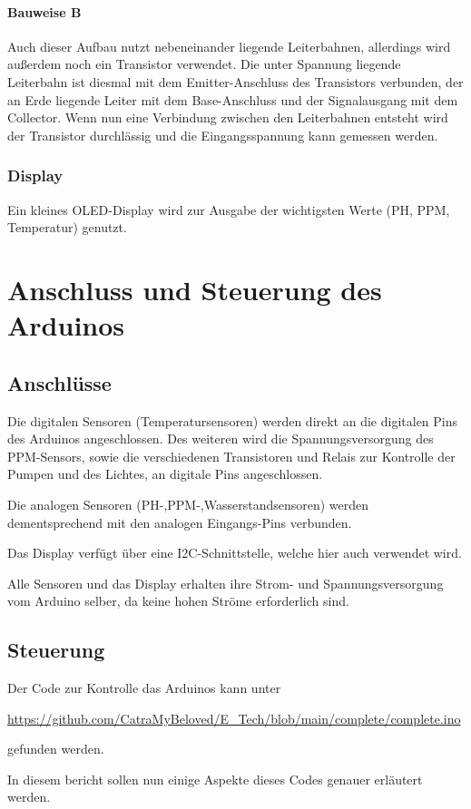 \documentclass{report}
\begin{document}
\subsubsection{Bauweise B}
Auch dieser Aufbau nutzt nebeneinander liegende Leiterbahnen, allerdings wird außerdem noch ein Transistor verwendet. Die unter Spannung liegende Leiterbahn ist diesmal mit dem Emitter-Anschluss des Transistors verbunden, der an Erde liegende Leiter mit dem Base-Anschluss und der Signalausgang mit dem Collector. Wenn nun eine Verbindung zwischen den Leiterbahnen entsteht wird der Transistor durchlässig und die Eingangsspannung kann gemessen werden.
\subsection{Display}
Ein kleines OLED-Display wird zur Ausgabe der wichtigsten Werte (PH, PPM, Temperatur) genutzt.
\chapter{Anschluss und Steuerung des Arduinos}
\section{Anschlüsse}
Die digitalen Sensoren (Temperatursensoren) werden direkt an die digitalen Pins des Arduinos angeschlossen. Des weiteren wird die Spannungsversorgung des PPM-Sensors, sowie die verschiedenen Transistoren und Relais zur Kontrolle der Pumpen und des Lichtes, an digitale Pins angeschlossen.

Die analogen Sensoren (PH-,PPM-,Wasserstandsensoren) werden dementsprechend mit den analogen Eingangs-Pins verbunden.

Das Display verfügt über eine I2C-Schnittstelle, welche hier auch verwendet wird.

Alle Sensoren und das Display erhalten ihre Strom- und Spannungsversorgung vom Arduino selber, da keine hohen Ströme erforderlich sind.
\section{Steuerung}
Der Code zur Kontrolle das Arduinos kann unter 

\url{https://github.com/CatraMyBeloved/E_Tech/blob/main/complete/complete.ino}

gefunden werden.

In diesem bericht sollen nun einige Aspekte dieses Codes genauer erläutert werden.
\end{document}
